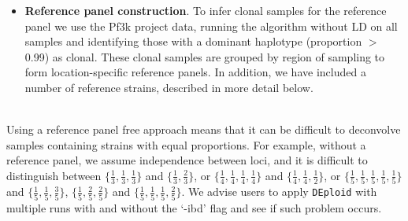 \documentclass[9pt]{article}
\begin{document}
\begin{itemize}
\begin{itemize}
\item {\bf Reference panel construction}. To infer clonal samples for the reference panel we use the Pf3k project data, running the algorithm without LD on all samples and identifying those with a dominant haplotype (proportion $>$ 0.99) as clonal.  These clonal samples are grouped by region of sampling to form location-specific reference panels.  In addition, we have included a number of reference strains, described in more detail below.

\end{itemize}



\end{itemize}



\\
Using a reference panel free approach means that it can be difficult to deconvolve samples containing strains with equal proportions. For example, without a reference panel, we assume independence between loci, and it is difficult to distinguish between $\{\frac{1}{3},\frac{1}{3},\frac{1}{3}\}$ and $\{\frac{1}{3},\frac{2}{3}\}$, or
$\{\frac{1}{4},\frac{1}{4}, \frac{1}{4}, \frac{1}{4}\}$ and $\{\frac{1}{4},\frac{1}{4}, \frac{1}{2}\}$, or $\{\frac{1}{5},\frac{1}{5}, \frac{1}{5}, \frac{1}{5}, \frac{1}{5}\}$ and $\{\frac{1}{5},\frac{1}{5}, \frac{3}{5}\}$, $\{\frac{1}{5},\frac{2}{5}, \frac{2}{5}\}$ and
$\{\frac{1}{5},\frac{1}{5}, \frac{1}{5}, \frac{2}{5}\}$. We advise users to apply {\tt DEploid} with multiple runs with and without the `-ibd' flag and see if such problem occurs.
\end{document}
